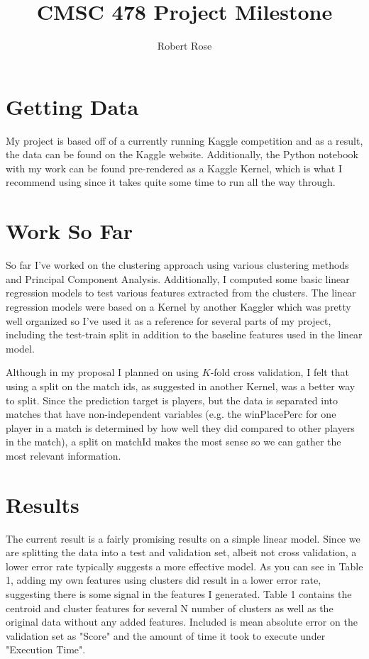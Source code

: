 \documentclass[11pt]{article}
\title{CMSC 478 Project Milestone}
\author{Robert Rose}
\makeatletter
\let\inserttitle\@title
\let\insertauthor\@author
\makeatother
\begin{document}
\begin{center}
  \LARGE{\inserttitle}

  \Large{\insertauthor}
\end{center}

\section{Getting Data}

My project is based off of a currently running Kaggle competition and as a result, the data can be
found on the Kaggle website.\cite{competition} Additionally, the Python notebook with my work can
be found pre-rendered as a Kaggle Kernel, which is what I recommend using since it takes quite some
time to run all the way through.\cite{clustering}

\section{Work So Far}

So far I've worked on the clustering approach using various clustering methods and Principal Component
Analysis.\cite{clustering} Additionally, I computed some basic linear regression models to test 
various features extracted from the clusters. The linear regression models were based on a Kernel by 
another Kaggler which was pretty well organized so I've used it as a reference for several parts 
of my project, including the test-train split in addition to the baseline features used in the 
linear model.\cite{feature-engineering}

Although in my proposal I planned on using $K$-fold cross validation, I felt that using a split on the
match ids, as suggested in another Kernel, was a better way to split.\cite{feature-engineering}
Since the prediction target is players, but the data is separated into matches that have non-independent
variables (e.g. the winPlacePerc for one player in a match is determined by how well they did compared to
other players in the match), a split on matchId makes the most sense so we can gather the most relevant
information.

\section{Results}

The current result is a fairly promising results on a simple linear model. Since we are splitting the
data into a test and validation set, albeit not cross validation, a lower error rate typically suggests
a more effective model. As you can see in Table 1, adding my own features using clusters did result in a 
lower error rate, suggesting there is some signal in the features I generated. Table 1 contains the 
centroid and cluster features for several N number of clusters as well as the original data without 
any added features. Included is mean absolute error on the validation set as "Score" and the amount 
of time it took to execute under "Execution Time".
\end{document}
